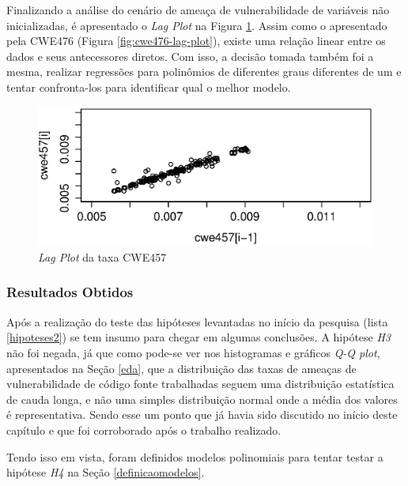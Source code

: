 Finalizando a análise do cenário de ameaça de vulnerabilidade de variáveis não
inicializadas, é apresentado o \textit{Lag Plot} na Figura
\ref{fig:cwe457-lag-plot}. Assim como o apresentado pela CWE476 (Figura
\ref{fig:cwe476-lag-plot}), existe uma relação linear entre os dados e seus
antecessores diretos. Com isso, a decisão tomada também foi a mesma, realizar
regressões para polinômios de diferentes graus diferentes de um e tentar
confronta-los para identificar qual o melhor modelo.

\begin{figure}[h]
  \centering
  \includegraphics[width=1.0\textwidth]
      {figuras/cwe457-lag-plot.eps}
      \caption{\textit{Lag Plot} da taxa CWE457}
  \label{fig:cwe457-lag-plot}
\end{figure}


\subsubsection{Resultados Obtidos}

Após a realização do teste das hipóteses levantadas no início da pesquisa (lista
\ref{hipoteses2}) se tem insumo para chegar em algumas conclusões. A hipótese
\textit{H3} não foi negada, já que como pode-se ver nos histogramas e gráficos
\textit{Q-Q plot}, apresentados na Seção \ref{eda}, que a distribuição das taxas
de ameaças de vulnerabilidade de código fonte trabalhadas seguem uma
distribuição estatística de cauda longa, e não uma simples distribuição normal
onde a média dos valores é representativa.  Sendo esse um ponto que já havia
sido discutido no início deste capítulo e que foi corroborado após o trabalho
realizado.

Tendo isso em vista, foram definidos modelos polinomiais para tentar testar a
hipótese \textit{H4} na Seção \ref{definicaomodelos}.
















